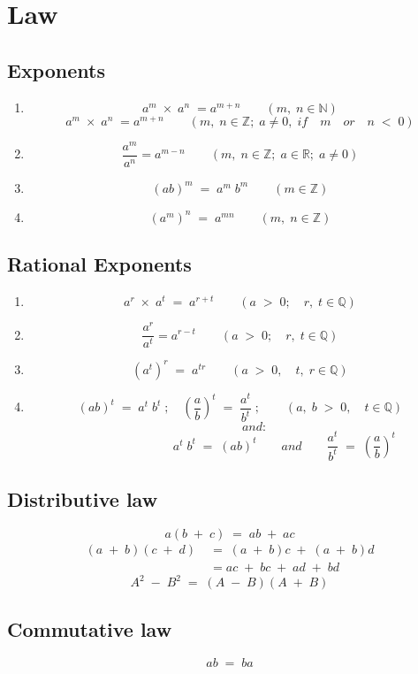 \section{Law}
\subsection{Exponents}
\begin{enumerate}
	\item
	\[a^m \; \times \; a^n \; = a^{m+n} \qquad (m, \; n \in \mathbb{N})\] \[a^m \; \times \; a^n \; = a^{m+n} \qquad (m, \; n \in \mathbb{Z}; \; a \neq 0, \; if \quad m \quad or \quad n \; < \; 0)\]
	\item
	\[\frac{a^m}{a^n}=a^{m-n} \qquad (m, \; n \in \mathbb{Z}; \; a \in \mathbb{R}; \; a \neq 0)\]
	\item
	\[(ab)^m \; = \; a^m \; b^m \qquad (m \in \mathbb{Z})\]
	\item
	\[(a^m)^n \; = \; a^{mn} \qquad (m, \; n \in \mathbb{Z})\]
\end{enumerate}
\subsection{Rational Exponents}
\begin{enumerate}
	\item
	\[a^r \; \times \; a^t \; = \; a^{r+t} \qquad (a \; > \; 0; \quad r, \; t \in \mathbb{Q})\]
	\item
	\[\frac{a^r}{a^t}=a^{r-t} \qquad (a \; > \; 0; \quad r, \;t \in \mathbb{Q})\]
	\item
	\[(a^t)^r \; = \; a^{tr} \qquad (a \; > \; 0, \quad t, \; r \in \mathbb{Q})\]
	\item
	\[(ab)^t \; = \; a^t \; b^t \; ; \quad \left(\frac{a}{b}\right)^t \; = \; \frac{a^t}{b^t} \; ; \qquad (a, \; b \; > \; 0, \quad t \in \mathbb{Q})\]
	\[\hspace{1cm} and :\]
	\[\hspace{3cm} a^t \; b^t \; = \; (ab)^t \qquad and \qquad \frac{a^t}{b^t} \; = \; \left(\frac{a}{b}\right)^t\]
\end{enumerate}
\subsection{Distributive law}
\[a(b \; + \; c) \; = \; ab \; + \; ac\]
\begin{align*}
	(a \; + \; b)(c \; + \; d) \; &= \; (a \; + \; b)c \; + \; (a \; + \; b)d \\
	&=ac \; + \;bc \; + \; ad \; + \; bd
\end{align*}
\[A^2 \; - \; B^2 \; = \; (A \; - \; B)(A \; + \; B)\]
\subsection{Commutative law}
\[ab \; = \; ba\]
